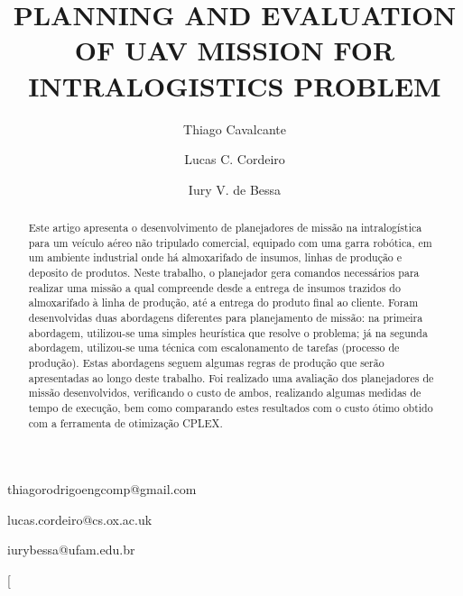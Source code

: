 \documentclass[conference,harvard,brazil,english]{sbatex}
\begin{document}

\title{PLANNING AND EVALUATION OF UAV MISSION FOR INTRALOGISTICS PROBLEM}

\author{Thiago Cavalcante}{thiagorodrigoengcomp@gmail.com}
\address{Graduate Program in Electrical Engineering, Federal University of Amazonas, Manaus, AM, Brazil}

\author{Lucas C. Cordeiro}{lucas.cordeiro@cs.ox.ac.uk}
\address{Department of Computer Science, University of Oxford, Oxford, United Kingdom}

\author{Iury V. de Bessa}{iurybessa@ufam.edu.br}
\address{Department of Electricity, Federal University of Amazonas, Manaus, AM, Brazil}



\twocolumn[

\maketitle

\begin{abstract}
 Este artigo apresenta o desenvolvimento de planejadores de missão na intralogística para um veículo aéreo não tripulado comercial, equipado com uma garra robótica, em um ambiente industrial onde há almoxarifado de insumos, linhas de produção e deposito de produtos. Neste trabalho, o planejador gera comandos necessários para realizar uma missão a qual compreende desde a entrega de insumos trazidos do almoxarifado à linha de produção, até a entrega do produto final ao cliente. Foram desenvolvidas duas abordagens diferentes para planejamento de missão: na primeira abordagem, utilizou-se uma simples heurística que resolve o problema; já na segunda abordagem, utilizou-se uma técnica com escalonamento de tarefas (processo de produção). Estas abordagens seguem algumas regras de produção que serão apresentadas ao longo deste trabalho. Foi realizado uma avaliação dos planejadores de missão desenvolvidos, verificando o custo de ambos, realizando algumas medidas de tempo de execução, bem como comparando estes resultados com o custo ótimo obtido  com a ferramenta de otimização CPLEX.   \end{abstract}

\end{document}
